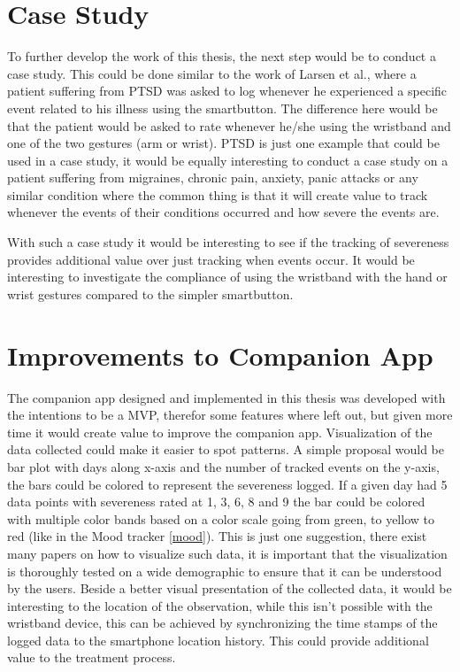 \section{Case Study}
To further develop the work of this thesis, the next step would be to conduct a case study. This could be done similar to the work of Larsen et al.\cite{eg}, where a patient suffering from PTSD was asked to log whenever he experienced a specific event related to his illness using the smartbutton. The difference here would be that the patient would be asked to rate whenever he/she using the wristband and one of the two gestures (arm or wrist). PTSD is just one example that could be used in a case study, it would be equally interesting to conduct a case study on a patient suffering from migraines, chronic pain, anxiety, panic attacks or any similar condition where the common thing is that it will create value to track whenever the events of their conditions occurred and how severe the events are.

With such a case study it would be interesting to see if the tracking of severeness provides additional value over just tracking when events occur. It would be interesting to investigate the compliance of using the wristband with the hand or wrist gestures compared to the simpler smartbutton.

\section{Improvements to Companion App}
The companion app designed and implemented in this thesis was developed with the intentions to be a MVP, therefor some features where left out, but given more time it would create value to improve the companion app. Visualization of the data collected could make it easier to spot patterns. A simple proposal would be bar plot with days along x-axis and the number of tracked events on the y-axis, the bars could be colored to represent the severeness logged. If a given day had 5 data points with severeness rated at 1, 3, 6, 8 and 9 the bar could be colored with multiple color bands based on a color scale going from green, to yellow to red (like in the Mood tracker \ref{mood}). This is just one suggestion, there exist many papers on how to visualize such data, it is important that the visualization is thoroughly tested on a wide demographic to ensure that it can be understood by the users. Beside a better visual presentation of the collected data, it would be interesting to the location of the observation, while this isn't possible with the wristband device, this can be achieved by synchronizing the time stamps of the logged data to the smartphone location history. This could provide additional value to the treatment process. 

